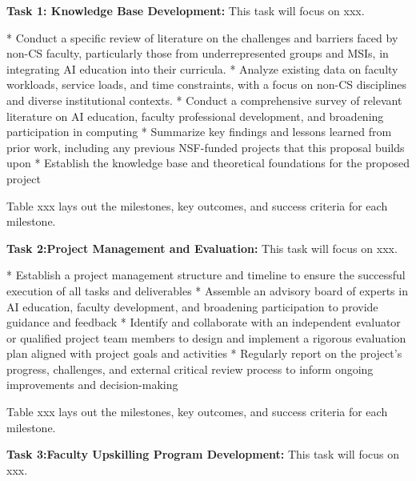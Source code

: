 \documentclass[11pt]{article}
\begin{document}
\begin{tcolorbox}[colback=mycmykcolor, colframe=black, boxrule=1pt, coltext=black]
\textbf{Task 1: Knowledge Base Development:} This task will focus on xxx.
\end{tcolorbox}

* Conduct a specific review of literature on the challenges and barriers faced by non-CS faculty, particularly those from underrepresented groups and MSIs, in integrating AI education into their curricula.
* Analyze existing data on faculty workloads, service loads, and time constraints, with a focus on non-CS disciplines and diverse institutional contexts.
* Conduct a comprehensive survey of relevant literature on AI education, faculty professional development, and broadening participation in computing
* Summarize key findings and lessons learned from prior work, including any previous NSF-funded projects that this proposal builds upon
* Establish the knowledge base and theoretical foundations for the proposed project


Table xxx lays out the milestones, key outcomes, and success criteria for each milestone. 

\begin{tcolorbox}[colback=mycmykcolor, colframe=black, boxrule=1pt, coltext=black]
\textbf{Task 2:Project Management and Evaluation:} This task will focus on xxx.
\end{tcolorbox}
* Establish a project management structure and timeline to ensure the successful execution of all tasks and deliverables
* Assemble an advisory board of experts in AI education, faculty development, and broadening participation to provide guidance and feedback
* Identify and collaborate with an independent evaluator or qualified project team members to design and implement a rigorous evaluation plan aligned with project goals and activities
* Regularly report on the project's progress, challenges, and external critical review process to inform ongoing improvements and decision-making

Table xxx lays out the milestones, key outcomes, and success criteria for each milestone. 

\begin{tcolorbox}[colback=mycmykcolor, colframe=black, boxrule=1pt, coltext=black]
\textbf{Task 3:Faculty Upskilling Program Development:} This task will focus on xxx.
\end{tcolorbox}
\end{document}
